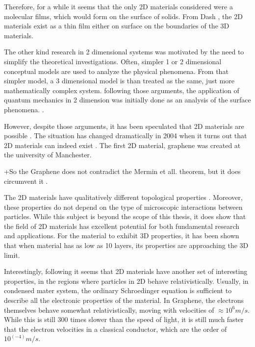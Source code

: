 Therefore, for a while it seems that the only 2D materials considered were a molecular films, which would form on the surface of solids. From Dash \cite{2DMatter1}, the 2D materials exist as a thin film either on surface on the boundaries of the 3D materials.

The other kind research in 2 dimensional systems was motivated by the need to simplify the theoretical investigations. Often, simpler 1 or 2 dimensional  conceptual models are used to analyze the physical phenomena. From that simpler model, a 3 dimensional model is than treated as the same, just more mathematically complex system.  following those arguments, the application of  quantum mechanics in 2 dimension was initially done as an analysis of the surface phenomena. \cite{2dfilm}. 

However, despite those arguments, it has been speculated that 2D materials are possible \cite{2DMatter1}. The situation has changed dramatically in 2004 when it turns out that 2D materials can indeed exist \cite{Graphene0}. The first 2D material, graphene was created \cite{GrapheneN} at the university of Manchester.

+So the Graphene does not contradict the Mermin et all. theorem, but it does circumvent it \cite{GrapheneRiples}.

The 2D materials have qualitatively different topological properties \cite{2DMatterCurvature}. Moreover, these properties do not depend on the type of microscopic interactions between particles. While this subject is beyond the scope of this thesis, it does show that the field of 2D materials has excellent potential for both fundamental research and applications. For the material to exhibit 3D properties, it has been shown \cite{GraphLayers} that when material has as low as 10 layers, its properties are approaching the 3D limit.

Interestingly, following \cite{Graphene0} it seems that 2D materials have another set of interesting properties, in the regions where particles in 2D behave relativistically. Usually, in condensed mater system, the ordinary Schroedinger equation is sufficient to describe all the electronic properties of the material. In Graphene, the electrons themselves behave somewhat relativistically, moving with velocities of $ \approx 10^6 m/s $. While this is still 300 times slower than the speed of light, it is still much faster that the electron velocities in a classical conductor, which are the order of $ 10^(-4) m/s $.

